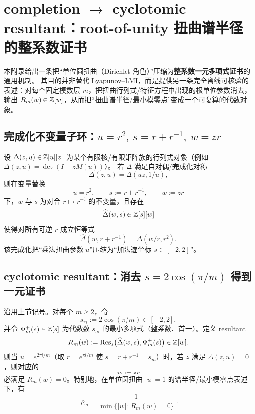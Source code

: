\section{completion \texorpdfstring{$\to$}{->} cyclotomic resultant：root-of-unity 扭曲谱半径的整系数证书}\label{app:cyclotomic-resultant-certificate}

本附录给出一条把“单位圆扭曲（Dirichlet 角色）”压缩为\textbf{整系数一元多项式证书}的通用机制。
其目的并非替代 Lyapunov--LMI，而是提供另一条完全离线可核验的表述：对每个固定模数层 \(m\)，把扭曲行列式/特征方程中出现的根单位参数消去，输出 \(R_m(w)\in\mathbb{Z}[w]\)，从而把“扭曲谱半径/最小模零点”变成一个可复算的代数对象。

\subsection{完成化不变量子环：\texorpdfstring{$u=r^2,\ s=r+r^{-1},\ w=zr$}{u=r^2, s=r+r^{-1}, w=zr}}\label{subsec:completion-invariant-ring-bridge}

设 \(\Delta(z,u)\in\mathbb{Z}[u][z]\) 为某个有限核/有限矩阵族的行列式对象（例如 \(\Delta(z,u)=\det(I-zM(u))\)）。
若 \(\Delta\) 满足自对偶/完成化对称
$$
\Delta(z,u)=\Delta(uz,1/u),
$$
则在变量替换
$$
u=r^2,\qquad s:=r+r^{-1},\qquad w:=zr
$$
下，\(w\) 与 \(s\) 为对合 \(r\mapsto r^{-1}\) 的不变量，且存在
$$
\widehat{\Delta}(w,s)\in\mathbb{Z}[s][w]
$$
使得对所有可逆 \(r\) 成立恒等式
$$
\widehat{\Delta}(w,r+r^{-1})=\Delta(w/r,r^2).
$$
该完成化把“乘法扭曲参数 \(u\)”压缩为“加法迹坐标 \(s\in[-2,2]\)”。

\subsection{cyclotomic resultant：消去 \texorpdfstring{$s=2\cos(\pi/m)$}{s=2cos(pi/m)} 得到一元证书}\label{subsec:cyclotomic-resultant}

\begin{proposition}\label{prop:completion-to-cyclotomic-resultant}
沿用上节记号。对每个 \(m\ge 2\)，令
$$
s_m:=2\cos(\pi/m)\in[-2,2],
$$
并令 \(\Phi_m^{+}(s)\in\mathbb{Z}[s]\) 为代数数 \(s_m\) 的最小多项式（整系数、首一）。定义 resultant
$$
R_m(w):=\operatorname{Res}_s\bigl(\widehat{\Delta}(w,s),\Phi_m^{+}(s)\bigr)\in\mathbb{Z}[w].
$$
则当 \(u=e^{2\pi i/m}\)（取 \(r=e^{\pi i/m}\) 使 \(s=r+r^{-1}=s_m\)）时，若 \(z\) 满足 \(\Delta(z,u)=0\)，则对应的
$$
w:=zr
$$
必满足 \(R_m(w)=0\)。特别地，在单位圆扭曲 \(|u|=1\) 的谱半径/最小模零点表述下，有
$$
\boxed{\;
\rho_m=\frac{1}{\min\{|w|:\ R_m(w)=0\}}\; }.
$$
\end{proposition}

